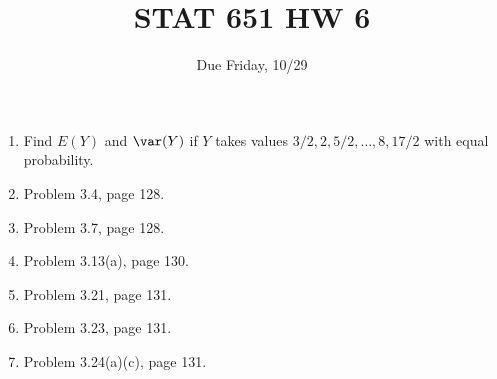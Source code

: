 \documentclass[12pt]{article}
\begin{document}
\title{STAT 651 HW 6}
\author{Due Friday, 10/29}
\date{}
\maketitle

\begin{enumerate}
\item Find $E(Y)$ and $\var(Y)$ if $Y$ takes values
$3/2, 2, 5/2,\dotsc, 8, 17/2$ with equal probability.
\item Problem 3.4, page 128.
\item Problem 3.7, page 128.
\item Problem 3.13(a), page 130.
\item Problem 3.21, page 131.
\item Problem 3.23, page 131.
\item Problem 3.24(a)(c), page 131.
\end{enumerate}
\end{document}
